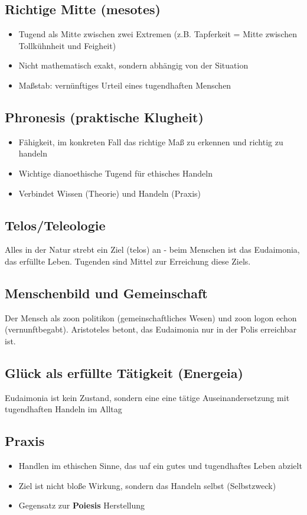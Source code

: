 \subsection{Richtige Mitte (mesotes)}
\begin{itemize}
    \item Tugend als Mitte zwischen zwei Extremen (z.B. Tapferkeit = Mitte zwischen Tollkühnheit und Feigheit)
    \item Nicht mathematisch exakt, sondern abhängig von der Situation
    \item Maßstab: vernünftiges Urteil eines tugendhaften Menschen
\end{itemize}

\subsection{Phronesis (praktische Klugheit)}
\begin{itemize}
    \item Fähigkeit, im konkreten Fall das richtige Maß zu erkennen und richtig zu handeln
    \item Wichtige dianoethische Tugend für ethisches Handeln
    \item Verbindet Wissen (Theorie) und Handeln (Praxis)
\end{itemize}

\subsection{Telos/Teleologie}
Alles in der Natur strebt ein Ziel (telos) an - beim Menschen ist das Eudaimonia, das erfüllte Leben. Tugenden sind Mittel zur Erreichung diese Ziels.

\subsection{Menschenbild und Gemeinschaft}
Der Mensch als zoon politikon (gemeinschaftliches Wesen) und zoon logon echon (vernunftbegabt). Aristoteles betont, das Eudaimonia nur in der Polis erreichbar ist.

\subsection{Glück als erfüllte Tätigkeit (Energeia)}
Eudaimonia ist kein Zustand, sondern eine eine tätige Auseinandersetzung mit tugendhaften Handeln im Alltag

\subsection{Praxis}
\begin{itemize}
    \item Handlen im ethischen Sinne, das uaf ein gutes und tugendhaftes Leben abzielt
    \item Ziel ist nicht bloße Wirkung, sondern das Handeln selbst (Selbstzweck)
    \item Gegensatz zur \textbf{Poiesis} Herstellung
\end{itemize}

